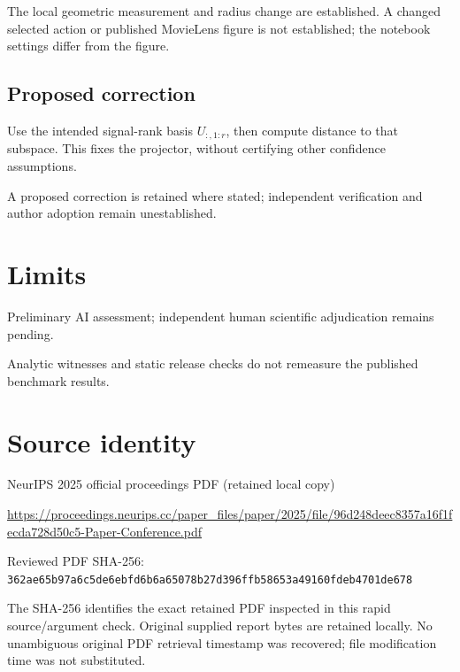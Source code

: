 \documentclass[11pt]{article}
\begin{document}
The local geometric measurement and radius change are established. A changed selected action or published MovieLens figure is not established; the notebook settings differ from the figure.

\subsection*{Proposed correction}

Use the intended signal-rank basis \(U_{:,1:r}\), then compute distance to that subspace. This fixes the projector, without certifying other confidence assumptions.

A proposed correction is retained where stated; independent verification and author adoption remain unestablished.

\section*{Limits}

Preliminary AI assessment; independent human scientific adjudication remains pending.\par

Analytic witnesses and static release checks do not remeasure the published benchmark results.\par

\section*{Source identity}

NeurIPS 2025 official proceedings PDF (retained local copy)

\url{https://proceedings.neurips.cc/paper_files/paper/2025/file/96d248deec8357a16f1fecda728d50c5-Paper-Conference.pdf}

Reviewed PDF SHA-256: \nolinkurl{362ae65b97a6c5de6ebfd6b6a65078b27d396ffb58653a49160fdeb4701de678}

The SHA-256 identifies the exact retained PDF inspected in this rapid source/argument check. Original supplied report bytes are retained locally. No unambiguous original PDF retrieval timestamp was recovered; file modification time was not substituted.
\end{document}
